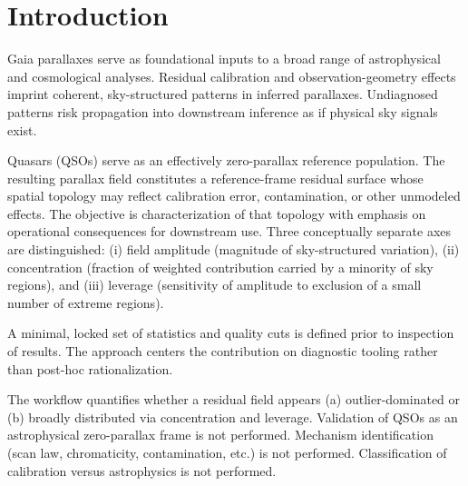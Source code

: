 \section{Introduction}

Gaia parallaxes serve as foundational inputs to a broad range of astrophysical and cosmological analyses. Residual calibration and observation-geometry effects imprint coherent, sky-structured patterns in inferred parallaxes. Undiagnosed patterns risk propagation into downstream inference as if physical sky signals exist.

Quasars (QSOs) serve as an effectively zero-parallax reference population. The resulting parallax field constitutes a reference-frame residual surface whose spatial topology may reflect calibration error, contamination, or other unmodeled effects. The objective is characterization of that topology with emphasis on operational consequences for downstream use. Three conceptually separate axes are distinguished: (i) field amplitude (magnitude of sky-structured variation), (ii) concentration (fraction of weighted contribution carried by a minority of sky regions), and (iii) leverage (sensitivity of amplitude to exclusion of a small number of extreme regions).

A minimal, locked set of statistics and quality cuts is defined prior to inspection of results. The approach centers the contribution on diagnostic tooling rather than post-hoc rationalization.

The workflow quantifies whether a residual field appears (a) outlier-dominated or (b) broadly distributed via concentration and leverage. Validation of QSOs as an astrophysical zero-parallax frame is not performed. Mechanism identification (scan law, chromaticity, contamination, etc.) is not performed. Classification of calibration versus astrophysics is not performed.

